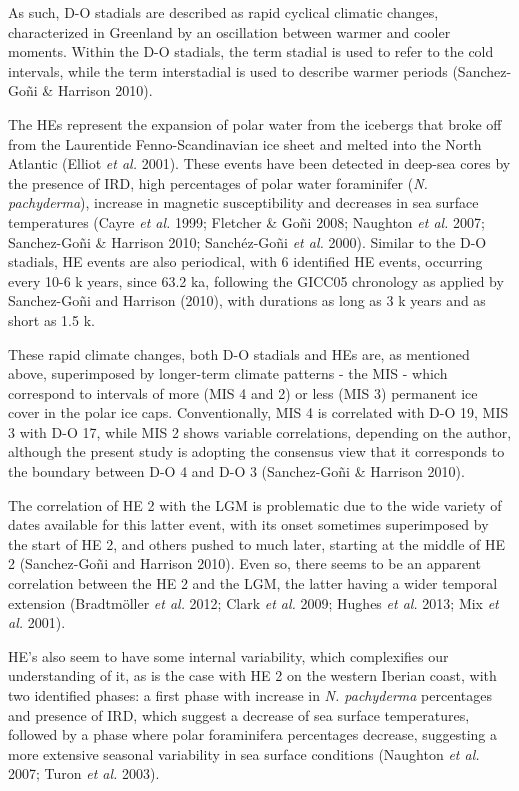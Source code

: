 \documentclass[12pt,twoside]{reedthesis}
\begin{document}
As such, D-O stadials are described as rapid cyclical climatic changes, characterized in Greenland by an oscillation between warmer and cooler moments. Within the D-O stadials, the term stadial is used to refer to the cold intervals, while the term interstadial is used to describe warmer periods (Sanchez-Goñi \& Harrison 2010).

The HEs represent the expansion of polar water from the icebergs that broke off from the Laurentide Fenno-Scandinavian ice sheet and melted into the North Atlantic (Elliot \emph{et al.} 2001). These events have been detected in deep-sea cores by the presence of IRD, high percentages of polar water foraminifer (\emph{N. pachyderma}), increase in magnetic susceptibility and decreases in sea surface temperatures (Cayre \emph{et al.} 1999; Fletcher \& Goñi 2008; Naughton \emph{et al.} 2007; Sanchez-Goñi \& Harrison 2010; Sanchéz-Goñi \emph{et al.} 2000). Similar to the D-O stadials, HE events are also periodical, with 6 identified HE events, occurring every 10-6 k years, since 63.2 ka, following the GICC05 chronology as applied by Sanchez-Goñi and Harrison (2010), with durations as long as 3 k years and as short as 1.5 k.

These rapid climate changes, both D-O stadials and HEs are, as mentioned above, superimposed by longer-term climate patterns - the MIS - which correspond to intervals of more (MIS 4 and 2) or less (MIS 3) permanent ice cover in the polar ice caps. Conventionally, MIS 4 is correlated with D-O 19, MIS 3 with D-O 17, while MIS 2 shows variable correlations, depending on the author, although the present study is adopting the consensus view that it corresponds to the boundary between D-O 4 and D-O 3 (Sanchez-Goñi \& Harrison 2010).

The correlation of HE 2 with the LGM is problematic due to the wide variety of dates available for this latter event, with its onset sometimes superimposed by the start of HE 2, and others pushed to much later, starting at the middle of HE 2 (Sanchez-Goñi and Harrison 2010). Even so, there seems to be an apparent correlation between the HE 2 and the LGM, the latter having a wider temporal extension (Bradtmöller \emph{et al.} 2012; Clark \emph{et al.} 2009; Hughes \emph{et al.} 2013; Mix \emph{et al.} 2001).

HE's also seem to have some internal variability, which complexifies our understanding of it, as is the case with HE 2 on the western Iberian coast, with two identified phases: a first phase with increase in \emph{N. pachyderma} percentages and presence of IRD, which suggest a decrease of sea surface temperatures, followed by a phase where polar foraminifera percentages decrease, suggesting a more extensive seasonal variability in sea surface conditions (Naughton \emph{et al.} 2007; Turon \emph{et al.} 2003).
\end{document}

